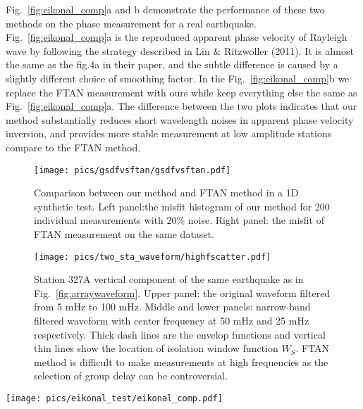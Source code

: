 \documentclass{gji}
\begin{document}
Fig.~\ref{fig:eikonal_comp}a and b demonstrate the performance of these two methods on the phase measurement for a real earthquake. Fig.~\ref{fig:eikonal_comp}a is the reproduced apparent phase velocity of Rayleigh wave by following the strategy described in Lin \& Ritzwoller (2011). It is almost the same as the fig.4a in their paper, and the subtle difference is caused by a slightly different choice of smoothing factor. In the Fig.~\ref{fig:eikonal_comp}b we replace the FTAN measurement with ours while keep everything else the same as Fig.~\ref{fig:eikonal_comp}a. The difference between the two plots indicates that our method substantially reduces short wavelength noises in apparent phase velocity inversion, and provides more stable measurement at low amplitude stations compare to the FTAN method. 

\begin{figure}
	\texttt{[image: pics/gsdfvsftan/gsdfvsftan.pdf]}
	\caption{Comparison between our method and FTAN method in a 1D synthetic test. Left panel:the misfit histogram of our method for 200 individual measurements with 20\% noise. Right panel: the misfit of FTAN measurement on the same dataset.}
	\label{fig:syntest}
\end{figure}

\begin{figure}
	\texttt{[image: pics/two\_sta\_waveform/highfscatter.pdf]}
	\caption{Station 327A vertical component of the same earthquake as in Fig.~\ref{fig:arraywaveform}. Upper panel: the original waveform filtered from 5 mHz to 100 mHz. Middle and lower panels: narrow-band filtered waveform with center frequency at 50 mHz and 25 mHz respectively. Thick dash lines are the envelop functions and vertical thin lines show the location of isolation window function $W_S$. FTAN method is difficult to make measurements at high frequencies as the selection of group delay can be controversial.}
	\label{fig:highfscatter}
\end{figure}

\begin{figure*}
	\texttt{[image: pics/eikonal\_test/eikonal\_comp.pdf]}
	\caption{Eikonal Tomography results using different phase measurement methods and Eikonal tomography inversions for the April 7, 2009 earthquake near Kuril Islands ($M_s$=6.8). We select the same earthquake as shown in fig. 3a of Lin and Ritzwoller (2011) for comparison. a) Phase velocity obtained by using the FTAN phase measurement, and taking travel-time surface gradient. b) Same as a) but using cross-correlation phase measurement. c) Same as b) but phase velocity is obtained by inversing slowness vector.}
	\label{fig:eikonal_comp}
\end{figure*}
\end{document}
